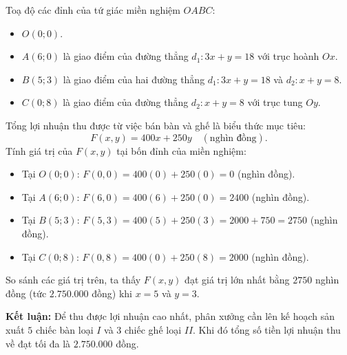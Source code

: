 \documentclass[12pt,a4paper]{article}
\begin{document}
\begin{enumerate}
\begin{center}
\end{center}

Toạ độ các đỉnh của tứ giác miền nghiệm $OABC$:
\begin{itemize}[leftmargin=0.5cm]
    \item $O(0; 0)$.
    \item $A(6; 0)$ là giao điểm của đường thẳng $d_1\colon 3x + y = 18$ với trục hoành $Ox$.
    \item $B(5; 3)$ là giao điểm của hai đường thẳng $d_1\colon 3x + y = 18$ và $d_2\colon x + y = 8$.
    \item $C(0; 8)$ là giao điểm của đường thẳng $d_2\colon x + y = 8$ với trục tung $Oy$.
\end{itemize}

Tổng lợi nhuận thu được từ việc bán bàn và ghế là biểu thức mục tiêu:
\[
F(x, y) = 400x + 250y \quad (\text{nghìn đồng}).
\]
Tính giá trị của $F(x, y)$ tại bốn đỉnh của miền nghiệm:
\begin{itemize}[leftmargin=0.5cm]
    \item Tại $O(0; 0)$: $F(0, 0) = 400(0) + 250(0) = 0$ (nghìn đồng).
    \item Tại $A(6; 0)$: $F(6, 0) = 400(6) + 250(0) = 2400$ (nghìn đồng).
    \item Tại $B(5; 3)$: $F(5, 3) = 400(5) + 250(3) = 2000 + 750 = 2750$ (nghìn đồng).
    \item Tại $C(0; 8)$: $F(0, 8) = 400(0) + 250(8) = 2000$ (nghìn đồng).
\end{itemize}
So sánh các giá trị trên, ta thấy $F(x, y)$ đạt giá trị lớn nhất bằng $2750$ nghìn đồng (tức $2.750.000$ đồng) khi $x = 5$ và $y = 3$.

\textbf{Kết luận:} Để thu được lợi nhuận cao nhất, phân xưởng cần lên kế hoạch sản xuất $5$ chiếc bàn loại $I$ và $3$ chiếc ghế loại $II$. Khi đó tổng số tiền lợi nhuận thu về đạt tối đa là $2.750.000$ đồng.
\end{enumerate}
\end{document}
